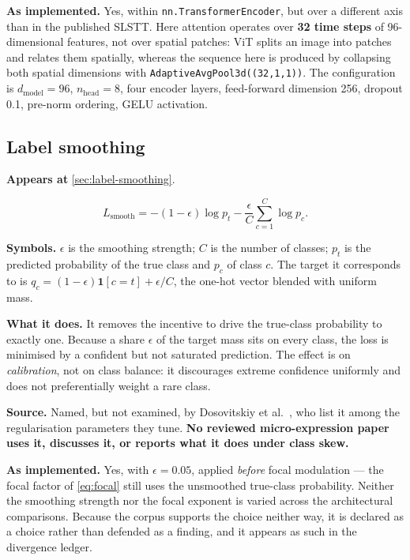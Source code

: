 \textbf{As implemented.} Yes, within \texttt{nn.TransformerEncoder}, but over
a different axis than in the published SLSTT. Here attention operates over
\textbf{32 time steps} of 96-dimensional features, not over spatial patches:
ViT splits an image into patches and relates them spatially, whereas the
sequence here is produced by collapsing both spatial dimensions with
\texttt{AdaptiveAvgPool3d((32,1,1))}. The configuration is $d_{\text{model}} =
96$, $n_{\text{head}} = 8$, four encoder layers, feed-forward dimension 256,
dropout 0.1, pre-norm ordering, GELU activation.

\subsection{Label smoothing}
\label{eq:label-smoothing}

\textbf{Appears at} \autoref{sec:label-smoothing}.

\[
    L_{\mathrm{smooth}}
      =-(1-\epsilon)\log p_t
        -\frac{\epsilon}{C}\sum_{c=1}^{C}\log p_c.
\]

\textbf{Symbols.} $\epsilon$ is the smoothing strength; $C$ is the number of
classes; $p_t$ is the predicted probability of the true class and $p_c$ of
class $c$. The target it corresponds to is
$q_c=(1-\epsilon)\mathbf{1}[c=t]+\epsilon/C$, the one-hot vector blended with
uniform mass.

\textbf{What it does.} It removes the incentive to drive the true-class
probability to exactly one. Because a share $\epsilon$ of the target mass sits
on every class, the loss is minimised by a confident but not saturated
prediction. The effect is on \emph{calibration}, not on class balance: it
discourages extreme confidence uniformly and does not preferentially weight a
rare class.

\textbf{Source.} Named, but not examined, by Dosovitskiy et
al.~\cite{dosovitskiy2021}, who list it among the regularisation parameters
they tune. \textbf{No reviewed micro-expression paper uses it, discusses it,
or reports what it does under class skew.}

\textbf{As implemented.} Yes, with $\epsilon = 0.05$, applied \emph{before}
focal modulation --- the focal factor of \autoref{eq:focal} still uses the
unsmoothed true-class probability. Neither the smoothing strength nor the
focal exponent is varied across the architectural comparisons. Because the
corpus supports the choice neither way, it is declared as a choice rather than
defended as a finding, and it appears as such in the divergence ledger.

